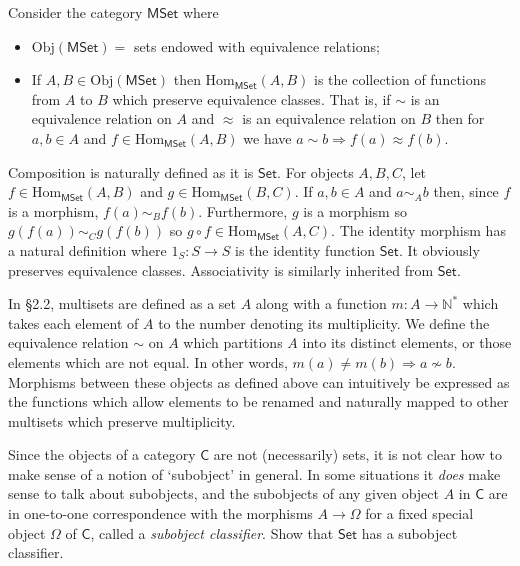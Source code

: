 \documentclass[../../master.tex]{subfiles}
\begin{document}
    \begin{solution}
      Consider the category \(\mathsf{MSet}\) where
      \begin{itemize}
        \item \(\text{Obj}(\mathsf{MSet}) =\) sets endowed with equivalence relations;
        \item If \(A, B \in \text{Obj}(\mathsf{MSet})\) then \(\text{Hom}_{\mathsf{MSet}}(A, B)\) is the collection of functions from \(A\) to \(B\) which preserve equivalence classes.
        That is, if \(\sim\) is an equivalence relation on \(A\) and \(\approx\) is an equivalence relation on \(B\) then
        for \(a, b \in A\) and \(f \in \text{Hom}_{\mathsf{MSet}}(A, B)\) we have \(a \sim b \Longrightarrow f(a) \approx f(b)\).
      \end{itemize}
      Composition is naturally defined as it is \(\mathsf{Set}\).
      For objects \(A, B, C\), let
      \(f \in \text{Hom}_{\mathsf{MSet}} (A, B)\) and \(g \in \text{Hom}_{\mathsf{MSet}} (B, C)\).
      If \(a, b \in A\) and \(a \sim_{A} b\) then, since \(f\) is a morphism, \(f(a) \sim_{B} f(b)\).
      Furthermore, \(g\) is a morphism so \(g(f(a)) \sim_{C} g(f(b))\) so \(g \circ f \in \text{Hom}_{\mathsf{MSet}}(A, C)\).
      The identity morphism has a natural definition where \(1_{S}: S \to S\) is the identity function \(\mathsf{Set}\).
      It obviously preserves equivalence classes.
      Associativity is similarly inherited from \(\mathsf{Set}\).

      In \S 2.2, multisets are defined as a set \(A\) along with a function \(m: A \to \mathbb{N}^{*}\) which takes each element of \(A\) to the number denoting its multiplicity.
      We define the equivalence relation \(\sim\) on \(A\) which partitions \(A\) into its distinct elements, or those elements which are not equal.
      In other words, \(m(a) \neq m(b) \Longrightarrow a \nsim b\).
      Morphisms between these objects as defined above can intuitively be expressed as
      the functions which allow elements to be renamed and naturally mapped to other multisets which preserve multiplicity.
    \end{solution}

    \begin{problem}
      Since the objects of a category \(\mathsf{C}\) are not (necessarily) sets, it is not clear how to make sense of a notion of `subobject' in general.
      In some situations it \textit{does} make sense to talk about subobjects,
      and the subobjects of any given object \(A\) in \(\mathsf{C}\) are in one-to-one correspondence with the morphisms \(A \to \Omega\)
      for a fixed special object \(\Omega\) of \(\mathsf{C}\), called a \textit{subobject classifier}.
      Show that \(\mathsf{Set}\) has a subobject classifier.
    \end{problem}
\end{document}
